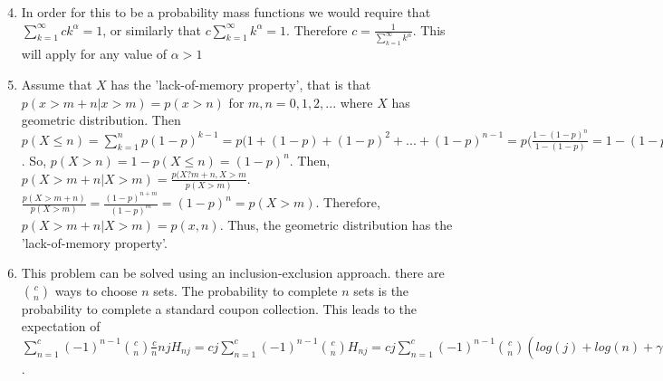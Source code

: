 \documentclass{article}
\begin{document}
\begin{enumerate}
    \setcounter{enumi}{3}
    \item 
    
    In order for this to be a probability mass functions we would require that $\sum_{k=1}^{\infty}ck^\alpha=1$, or similarly that $c\sum_{k=1}^{\infty}k^\alpha=1$. Therefore $c=\frac{1}{\sum_{k=1}^{\infty}k^\alpha}$. This will apply for any value of $\alpha>1$
    
    \item
    
    Assume that $X$ has the 'lack-of-memory property', that is that $p(x>m+n|x>m)=p(x>n)$ for $m, n=0, 1, 2, ...$ where $X$ has geometric distribution. Then $p(X\leq n)= \sum_{k=1}^np(1-p)^{k-1}=p(1+(1-p)+(1-p)^2+...+(1-p)^{n-1}=p(\frac{1-(1-p)^n}{1-(1-p)}=1-(1-p)^n$. So, $p(X>n)=1-p(X\leq n)=(1-p)^n$. Then, $p(X>m+n|X>m)=\frac{p(X?m+n, X>m}{p(X>m)}$. $\frac{p(X>m+n)}{p(X>m)}=\frac{(1-p)^{n+m}}{(1-p)^m}=(1-p)^n=p(X>m)$. Therefore, $p(X>m+n|X>m)=p(x, n)$. Thus, the geometric distribution has the 'lack-of-memory property'.
    
    \setcounter{enumi}{6}
    \item
    
    This problem can be solved using an inclusion-exclusion approach. there are $\binom{c}{n}$ ways to choose $n$ sets. The probability to complete $n$ sets is the probability to complete a standard coupon collection. This leads to the expectation of $\sum_{n=1}^c(-1)^{n-1}\binom{c}{n}\frac{c}{n}njH_{nj}=cj\sum_{n=1}^c(-1)^{n-1}\binom{c}{n}H_{nj}=cj\sum_{n=1}^c(-1)^{n-1}\binom{c}{n}(log(j)+log(n)+\gamma+\frac{1}{2nj})+O(\frac{c}{j})=cj(log(n)+\gamma)+\frac{1}{2}cH_c+cj\sum_{n=1}^c(-1)^{n-1}\binom{c}{n}log(n)O(\frac{c}{j})=cjH_n+\frac{1}{2}cH_c-c+cj\sum_{n=1}^c(-1)^{n-1}\binom{c}{n} log(n)+O(\frac{c}{j})$.
    
\end{enumerate}
\end{document}
